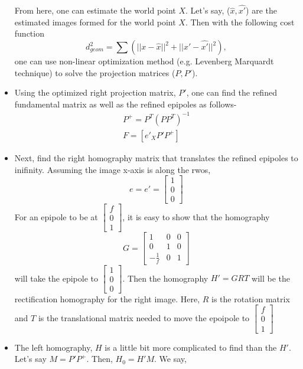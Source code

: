 \documentclass{article}
\begin{document}
\begin{itemize}
From here, one can estimate the world point $X$.
Let's say, ($\hat{x},\hat{x'}$) are the estimated images formed for the world point $X$. Then with the following cost function
\begin{equation}
	d_{geom}^2 = \sum(||x-\hat{x}||^2 + ||x' - \hat{x'}||^2),
\end{equation}
one can use non-linear optimization method (e.g. Levenberg Marquardt technique) to solve the projection matrices ($P,P'$).
\item Using the optimized right projection matrix, $P'$, one can find the refined fundamental matrix as well as the refined epipoles as follows-
\begin{eqnarray}
	P^+ = P^T(PP^T)^{-1}\\
	F = [e'_XP'P^+]
\end{eqnarray}
\item Next, find the right homography matrix that translates the refined epipoles to inifinity. Assuming the image x-axis is along the rwos,
\begin{equation}
e = e' = \begin{bmatrix}
	1 \\ 0 \\ 0
\end{bmatrix}
\end{equation}
For an epipole to be at $\begin{bmatrix}f \\0 \\1\end{bmatrix}$, it is easy to show that the homography 
\begin{equation}
	G = \begin{bmatrix}
		1 & 0 & 0 \\ 0 & 1 & 0 \\ -\frac{1}{f} & 0 & 1
	\end{bmatrix}
\end{equation}
will take the epipole to $\begin{bmatrix}1 \\ 0 \\ 0\end{bmatrix}$. Then the homography $H' = GRT$ will be the rectification homography for the right image. Here, $R$ is the rotation matrix and $T$ is the translational matrix needed to  move the epoipole to $\begin{bmatrix}
f \\ 0 \\1\end{bmatrix}$
\item The left homography, $H$ is a little bit more complicated to find than the $H'$. Let's say $M = P'P^+$. Then, $H_0 = H'M$. We say,

\end{itemize}
\end{document}
